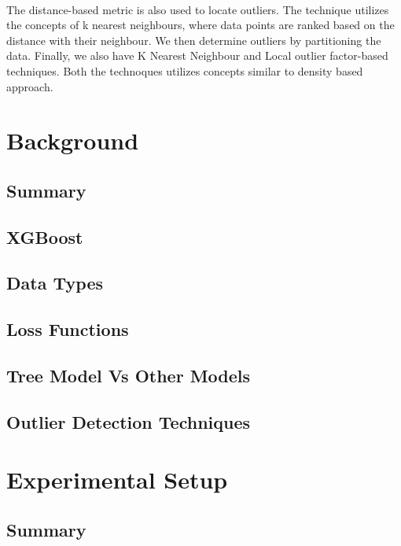 \documentclass[runningheads]{llncs}
\begin{document}
\paragraph{} The distance-based metric is also used to locate outliers. The technique utilizes the concepts of k nearest neighbours, where data points are ranked based on the distance with their neighbour. We then determine outliers by partitioning the data.  Finally, we also have K Nearest Neighbour and Local outlier factor-based techniques. Both the technoques utilizes concepts similar to density based approach.







\section{Background}

\subsection{Summary}
\subsection{XGBoost}
\subsection{Data Types}
\subsection{Loss Functions}
\subsection{Tree Model Vs Other Models}
\subsection{Outlier Detection Techniques}

\section{Experimental Setup}
\subsection{Summary}
\end{document}
